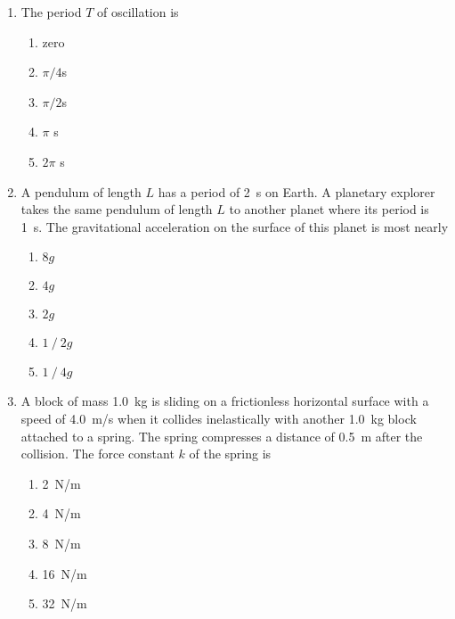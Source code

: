 \documentclass{../../oss-apphys}
\begin{document}
\begin{multicols}{2}
\begin{enumerate}[leftmargin=18pt,start=8]
  \item The period $T$ of oscillation is
    \begin{enumerate}[noitemsep,topsep=0pt]
    \item zero
    \item $\pi/4$\si{s}
    \item $\pi/2$\si{s}
    \item $\pi$  \si{s}
    \item $2\pi$ \si{s}
    \end{enumerate}

    \columnbreak
    
  \item A pendulum of length $L$ has a period of \SI{2}{\s} on Earth. A
    planetary explorer takes the same pendulum of length $L$ to another planet
    where its period is \SI{1}{\s}. The gravitational acceleration on the
    surface of this planet is most nearly
    \begin{enumerate}[noitemsep,topsep=0pt]
    \item $8 g$
    \item $4 g$
    \item $2 g$
    \item $1⁄2 g$
    \item $1⁄4 g$
    \end{enumerate}

  \item A block of mass \SI{1.0}{\kg} is sliding on a frictionless horizontal
    surface with a speed of \SI{4.0}{m/s} when it collides inelastically with
    another \SI{1.0}{kg} block attached to a spring. The spring compresses a
    distance of \SI{0.5}{m} after the collision. The force constant $k$ of the
    spring is
    \begin{center}
    \end{center}
    \begin{enumerate}[noitemsep,topsep=0pt]
    \item\SI{2}{N/m}
    \item\SI{4}{N/m}
    \item\SI{8}{N/m}
    \item\SI{16}{N/m}
    \item\SI{32}{N/m}
    \end{enumerate}


\end{enumerate}
\end{multicols}
\end{document}
